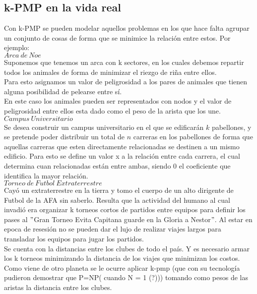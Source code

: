 \subsection{k-PMP en la vida real}

Con k-PMP se pueden modelar aquellos problemas en los que hace falta agrupar un conjunto de cosas de forma que se minimice la relación entre estos.
Por ejemplo:\\

$Arca\ de\ Noe$\\
Suponemos que tenemos un arca con k sectores, en los cuales debemos repartir todos los animales de forma de minimizar el riezgo de riña entre ellos.\\
Para esto asignamos un valor de peligrosidad a los pares de animales que tienen alguna posibilidad de pelearse entre s\'i.\\
En este caso los animales pueden ser representados con nodos y el valor de peligrosidad entre ellos esta dado como el peso de la arista que los une.\\


$Campus\ Universitario$\\
Se desea construir un campus universitario en el que se edificarán $k$ pabellones, y se pretende poder distribuir un total de $n$ carreras en los pabellones de forma que aquellas carreras que esten directamente relacionadas se destinen a un mismo edificio. Para esto se define un valor x a la relaci\'on entre cada carrera, el cual determina cuan relacionadas están entre ambas, siendo 0 el coeficiente que identifica la mayor relación.\\


$Torneo\ de\ Futbol\ Extraterrestre$\\
Cay\'o un extraterrestre en la tierra y tomo el cuerpo de un alto dirigente de Futbol de la AFA sin saberlo. Resulta que la actividad del humano al cual invadi\'o era organizar k torneos cortos de partidos entre equipos para definir los pases al $"$Gran Torneo Evita Capitana guarde en la Gloria a Nestor$"$. Al estar en epoca de resesi\'on no se pueden dar el lujo de realizar viajes largos para transladar los equipos para jugar los partidos.\\
Se cuenta con la distancias entre los clubes de todo el pa\'is. Y es necesario armar los k torneos minimizando la distancia de los viajes que minimizan los costos.\\
Como viene de otro planeta se le ocurre aplicar k-pmp (que con su tecnolog\'ia pudieron demostrar que P=NP( cuando N = 1 (?))) tomando como pesos de las aristas la distancia entre los clubes.